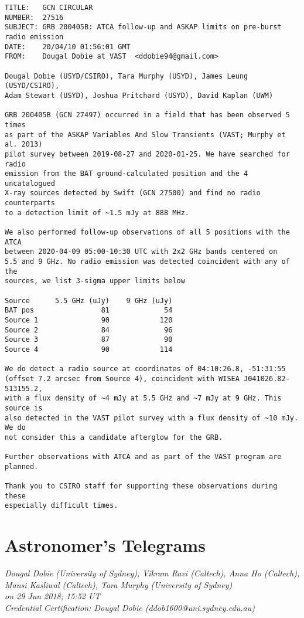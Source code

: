 \begin{verbatim}
TITLE:   GCN CIRCULAR
NUMBER:  27516
SUBJECT: GRB 200405B: ATCA follow-up and ASKAP limits on pre-burst radio emission
DATE:    20/04/10 01:56:01 GMT
FROM:    Dougal Dobie at VAST  <ddobie94@gmail.com>

Dougal Dobie (USYD/CSIRO), Tara Murphy (USYD), James Leung (USYD/CSIRO),
Adam Stewart (USYD), Joshua Pritchard (USYD), David Kaplan (UWM)

GRB 200405B (GCN 27497) occurred in a field that has been observed 5 times
as part of the ASKAP Variables And Slow Transients (VAST; Murphy et al. 2013)
pilot survey between 2019-08-27 and 2020-01-25. We have searched for radio
emission from the BAT ground-calculated position and the 4 uncatalogued
X-ray sources detected by Swift (GCN 27500) and find no radio counterparts
to a detection limit of ~1.5 mJy at 888 MHz.

We also performed follow-up observations of all 5 positions with the ATCA
between 2020-04-09 05:00-10:30 UTC with 2x2 GHz bands centered on
5.5 and 9 GHz. No radio emission was detected coincident with any of the
sources, we list 3-sigma upper limits below

Source      5.5 GHz (uJy)    9 GHz (uJy)
BAT pos                81             54
Source 1               90            120
Source 2               84             96
Source 3               87             90
Source 4               90            114

We do detect a radio source at coordinates of 04:10:26.8, -51:31:55
(offset 7.2 arcsec from Source 4), coincident with WISEA J041026.82-513155.2,
with a flux density of ~4 mJy at 5.5 GHz and ~7 mJy at 9 GHz. This source is
also detected in the VAST pilot survey with a flux density of ~10 mJy. We do
not consider this a candidate afterglow for the GRB.

Further observations with ATCA and as part of the VAST program are planned.

Thank you to CSIRO staff for supporting these observations during these
especially difficult times.
\end{verbatim}
\endgroup
\pagebreak
\section{Astronomer's Telegrams}

\begingroup
\footnotesize
{}
\begin{center}
\textit{Dougal Dobie (University of Sydney), Vikram Ravi (Caltech), Anna Ho (Caltech),\\
Mansi Kasliwal (Caltech), Tara Murphy (University of Sydney)\\
on 29 Jun 2018; 15:52 UT\\
Credential Certification: Dougal Dobie (ddob1600@uni.sydney.edu.au)}
\end{center}

